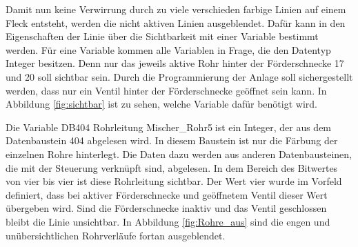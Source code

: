 Damit nun keine Verwirrung durch zu viele verschieden farbige Linien auf einem Fleck entsteht, werden die nicht aktiven Linien ausgeblendet. Dafür kann in den Eigenschaften der Linie über die Sichtbarkeit mit einer Variable bestimmt werden. Für eine Variable kommen alle Variablen in Frage, die den Datentyp Integer besitzen. Denn nur das jeweils aktive Rohr hinter der Förderschnecke 17 und 20 soll sichtbar sein. Durch die Programmierung der Anlage soll sichergestellt werden, dass nur ein Ventil hinter der Förderschnecke geöffnet sein kann. In Abbildung \ref{fig:sichtbar} ist zu sehen, welche Variable dafür benötigt wird. 
 
 \begin{figure}[H] %
 \end{figure} %

Die \glqq Variable DB404 Rohrleitung Mischer\_Rohr5\grqq \textcolor{white}{l}ist ein Integer, der aus dem Datenbaustein 404 abgelesen wird. In diesem Baustein ist nur die Färbung der einzelnen Rohre hinterlegt. Die Daten dazu werden aus anderen Datenbausteinen, die mit der Steuerung verknüpft sind, abgelesen. In dem Bereich des Bitwertes von vier bis vier ist diese Rohrleitung sichtbar. Der Wert vier wurde im Vorfeld definiert, dass bei aktiver Förderschnecke und geöffnetem Ventil dieser Wert übergeben wird. Sind die Förderschnecke inaktiv und das Ventil geschlossen bleibt die Linie unsichtbar. In Abbildung \ref{fig:Rohre_aus} sind die engen und unübersichtlichen Rohrverläufe fortan ausgeblendet. \\

